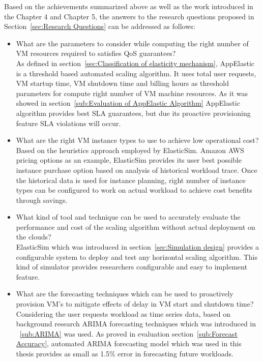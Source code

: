Based on the achievements summarized above as well as the work introduced in the Chapter 4 and Chapter 5, the answers to the research questions proposed in Section~\ref{sec:Research Questions} can be addressed as follows:
\begin{itemize}
  \item What are the parameters to consider while computing the right number of VM resources required to satisfies QoS guarantees?
  \\
  As defined in section~\ref{sec:Classification of elasticity mechanism}, AppElastic is a threshold based automated scaling algorithm. It uses total user requests, VM startup time, VM shutdown time and billing hours as threshold parameters for compute right number of VM machine resources. As it was showed in section~\ref{sub:Evaluation of AppElastic Algorithm} AppElastic algorithm provides best SLA guarantees, but due its proactive provisioning feature SLA violations will occur.
  \item What are the right VM instance types to use to achieve low operational cost?
  \\
  Based on the heuristics approach employed by ElasticSim. Amazon AWS pricing options as an example, ElasticSim provides its user best possible instance purchase option based on analysis of historical workload trace. Once the historical data is used for instance planning, right number of instance types can be configured to work on actual workload to achieve cost benefits through savings.
  \item What kind of tool and technique can be used to accurately evaluate the performance and cost of the scaling algorithm without actual deployment on the clouds?
  \\
  ElasticSim which was introduced in section~\ref{sec:Simulation design} provides a configurable system to deploy and test any horizontal scaling algorithm. This kind of simulator provides researchers configurable and easy to implement feature.
  \item What are the forecasting techniques which can be used to proactively provision VM's to mitigate effects of delay in VM start and shutdown time?
  \\
  Considering the user requests workload as time series data, based on background research ARIMA forecasting techniques which was introduced in ~\ref{sub:ARIMA} was used. As proved in evaluation section~\ref{sub:Forecast Accuracy}, automated ARIMA forecasting model which was used in this thesis provides as small as 1.5\% error in forecasting future workloads.
\end{itemize}
